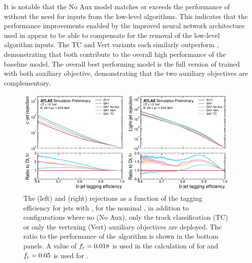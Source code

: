 It is notable that the \GNN No Aux model matches or exceeds the performance of \DLr without the need for inputs from the low-level algorithms.
This indicates that the performance improvements enabled by the improved neural network architecture used in \GNN appear to be able to compensate for the removal of the low-level algorithm inputs.
The \GNN TC and \GNN Vert variants each similarly outperform \DLr, demonstrating that both contribute to the overall high performance of the baseline model.
The overall best performing model is the full version of \GNN trained with both auxiliary objective, demonstrating that the two auxiliary objectives are complementary.

\begin{figure}[!p]
    \centering
    \includegraphics[width=\textwidth]{chapters/gnn_tagger/figs/results/ablations/ttbar/ttbar_roc_btag.pdf}
    \caption{The \cjet (left) and \ljet (right) rejections as a function of the \bjet tagging efficiency for \ttbar jets with \ttbarpt, for the nominal \GNN, in addition to configurations where no (\GNN No Aux), only the track classification (\GNN TC) or only the vertexing (\GNN Vert) auxiliary objectives are deployed. The ratio to the performance of the \DLr algorithm is shown in the bottom panels. A value of $f_c = 0.018$ is used in the calculation of \Db for \DLr and $f_c = 0.05$ is used for \GNN \cite{ATL-PHYS-PUB-2022-027}.}
    \label{fig:ttbar_btag_roc_ab}
\end{figure}

